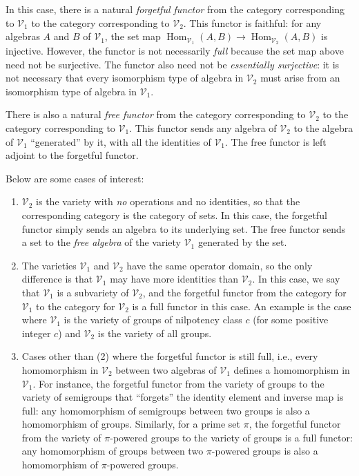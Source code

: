 In this case, there is a natural {\em forgetful functor} from the
category corresponding to $\mathcal{V}_1$ to the category
corresponding to $\mathcal{V}_2$. This functor is faithful: for any
algebras $A$ and $B$ of $\mathcal{V}_1$, the set map
$\operatorname{Hom}_{\mathcal{V}_1}(A,B) \to
\operatorname{Hom}_{\mathcal{V}_2}(A,B)$ is injective. However, the
functor is not necessarily {\em full} because the set map above need
not be surjective. The functor also need not be {\em essentially
  surjective}: it is not necessary that every isomorphism type of
algebra in $\mathcal{V}_2$ must arise from an isomorphism type of
algebra in $\mathcal{V}_1$.

There is also a natural {\em free functor} from the category
corresponding to $\mathcal{V}_2$ to the category corresponding to
$\mathcal{V}_1$. This functor sends any algebra of $\mathcal{V}_2$ to
the algebra of $\mathcal{V}_1$ ``generated'' by it, with all the
identities of $\mathcal{V}_1$. The free functor is left adjoint to the
forgetful functor.

Below are some cases of interest:

\begin{enumerate}
\item $\mathcal{V}_2$ is the variety with {\em no}
  operations and no identities, so that the corresponding category is
  the category of sets. In this case, the forgetful functor simply
  sends an algebra to its underlying set. The free functor sends a set
  to the {\em free algebra} of the variety $\mathcal{V}_1$ generated
  by the set.
\item The varieties $\mathcal{V}_1$ and $\mathcal{V}_2$ have the same
  operator domain, so the only difference is that $\mathcal{V}_1$ may
  have more identities than $\mathcal{V}_2$. In this case, we say that
  $\mathcal{V}_1$ is a subvariety of $\mathcal{V}_2$, and the
  forgetful functor from the category for $\mathcal{V}_1$ to the
  category for $\mathcal{V}_2$ is a full functor in this case. An
  example is the case where $\mathcal{V}_1$ is the variety of groups
  of nilpotency class $c$ (for some positive integer $c$) and
  $\mathcal{V}_2$ is the variety of all groups.
\item Cases other than (2) where the forgetful functor is still full,
  i.e., every homomorphism in $\mathcal{V}_2$ between two algebras of
  $\mathcal{V}_1$ defines a homomorphism in $\mathcal{V}_1$. For
  instance, the forgetful functor from the variety of groups to the
  variety of semigroups that ``forgets'' the identity element and
  inverse map is full: any homomorphism of semigroups between two
  groups is also a homomorphism of groups. Similarly, for a prime set
  $\pi$, the forgetful functor from the variety of $\pi$-powered
  groups to the variety of groups is a full functor: any homomorphism
  of groups between two $\pi$-powered groups is also a homomorphism of
  $\pi$-powered groups.
\end{enumerate}

